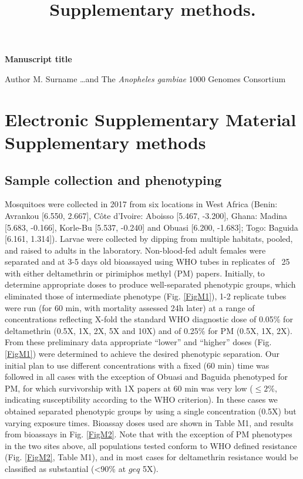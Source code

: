 \documentclass[a4paper,12pt]{article}
\title{Supplementary methods.}
\begin{document}
\onehalfspacing

\begin{center}
	\Large
	\noindent \textbf{Manuscript title}

	\normalsize

	\vskip 3cm

\end{center}


\noindent Author M. Surname \ldots and The \textit{Anopheles gambiae} 1000 Genomes Consortium
 
\vskip 2cm 


\section*{Electronic Supplementary Material \\ Supplementary methods}

\clearpage

\subsection{Sample collection and phenotyping}

Mosquitoes were collected in 2017 from six locations in West Africa (Benin: Avrankou [6.550, 2.667], Côte d’Ivoire: Aboisso [5.467, -3.200], Ghana: Madina [5.683, -0.166], Korle-Bu [5.537, -0.240] and Obuasi [6.200, -1.683]; Togo: Baguida [6.161, 1.314]). Larvae were collected by dipping from multiple habitats, pooled, and raised to adults in the laboratory. Non-blood-fed adult females were separated and at 3-5 days old bioassayed using WHO tubes in replicates of ~25 with either deltamethrin or pirimiphos methyl (PM) papers. Initially, to determine appropriate doses to produce well-separated phenotypic groups, which eliminated those of intermediate phenotype (Fig. \ref{FigM1}), 1-2 replicate tubes were run (for 60 min, with mortality assessed 24h later) at a range of concentrations reflecting X-fold the standard WHO diagnostic dose of 0.05\% for deltamethrin (0.5X, 1X, 2X, 5X and 10X) and of 0.25\% for PM (0.5X, 1X, 2X). From these preliminary data appropriate ``lower'' and ``higher'' doses (Fig. \ref{FigM1}) were determined to achieve the desired phenotypic separation. Our initial plan to use different concentrations with a fixed (60 min) time was followed in all cases with the exception of Obuasi and Baguida phenotyped for PM, for which survivorship with 1X papers at 60 min was very low ($\leq 2\%$, indicating susceptibility according to the WHO criterion). In these cases we obtained separated phenotypic groups by using a single concentration (0.5X) but varying exposure times. Bioassay doses used are shown in Table M1, and results from bioassays in Fig. \ref{FigM2}. Note that with the exception of PM phenotypes in the two sites above, all populations tested conform to WHO defined resistance (Fig. \ref{FigM2}, Table M1), and in most cases for deltamethrin resistance would be classified as substantial (<90\% at $geq$ 5X).
\end{document}
